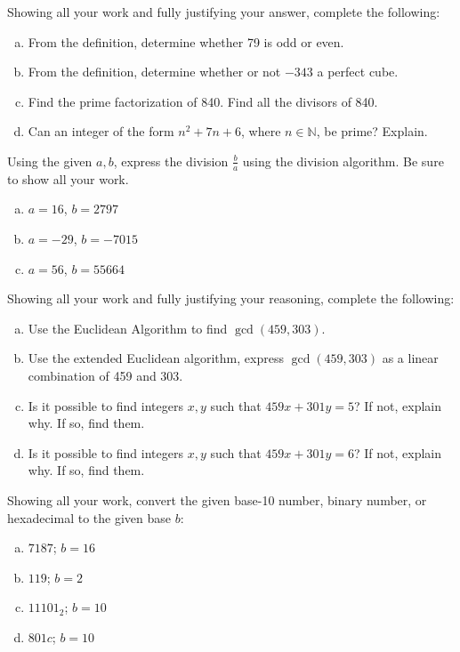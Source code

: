 \documentclass[11pt,letterpaper]{article}
\begin{document}

 Showing all your work and fully justifying your answer, complete the following:
	\begin{enumerate}[(a)]
	\item From the definition, determine whether 79 is odd or even. 
	\item From the definition, determine whether or not $-343$ a perfect cube.
	\item Find the prime factorization of 840. Find all the divisors of 840. 
	\item Can an integer of the form $n^2 + 7n + 6$, where $n \in \mathbb{N}$, be prime? Explain. 
	\end{enumerate}



\newpage



 Using the given $a, b$, express the division $\frac{b}{a}$ using the division algorithm. Be sure to show all your work. 
	\begin{enumerate}[(a)]
	\item $a= 16$, $b= 2797$
	\item $a= -29$, $b= -7015$
	\item $a= 56$, $b= 55664$
	\end{enumerate}



\newpage



 Showing all your work and fully justifying your reasoning, complete the following: 
	\begin{enumerate}[(a)]
	\item Use the Euclidean Algorithm to find $\gcd(459, 303)$. 
	\item Use the extended Euclidean algorithm, express $\gcd(459, 303)$ as a linear combination of 459 and 303. 
	\item Is it possible to find integers $x, y$ such that $459x + 301y= 5$? If not, explain why. If so, find them.  
	\item Is it possible to find integers $x, y$ such that $459x + 301y= 6$? If not, explain why. If so, find them.  
	\end{enumerate}



\newpage



 Showing all your work, convert the given base-10 number, binary number, or hexadecimal to the given base $b$:
	\begin{enumerate}[(a)]
	\item $7187$; $b= 16$
	\item $119$; $b= 2$
	\item $11101_2$; $b= 10$
	\item $801c$; $b= 10$
	\end{enumerate}
\end{document}

